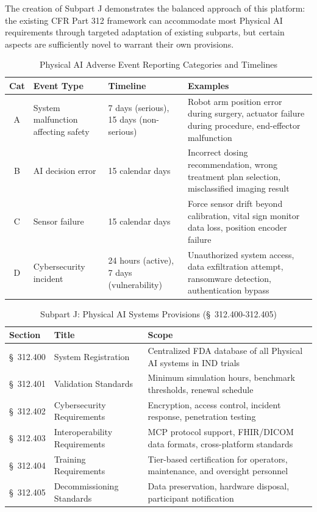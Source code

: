 The creation of Subpart J demonstrates the balanced approach of this platform:
the existing CFR Part 312 framework can accommodate most Physical AI
requirements through targeted adaptation of existing subparts, but certain
aspects are sufficiently novel to warrant their own provisions. 

\begin{table}[H]
\centering
\caption{Physical AI Adverse Event Reporting Categories and Timelines}
\label{tab:ae-categories}
\small
\begin{tabularx}{\textwidth}{c p{4.9cm} p{4.9cm} p{4.9cm}}
\toprule
\textbf{Cat} & \textbf{Event Type} & \textbf{Timeline} & \textbf{Examples} \\
\midrule
A & System malfunction affecting safety & 7 days (serious), 15 days (non-serious) & Robot arm position error during surgery, actuator failure during procedure, end-effector malfunction \\
B & AI decision error & 15 calendar days & Incorrect dosing recommendation, wrong treatment plan selection, misclassified imaging result \\
C & Sensor failure & 15 calendar days & Force sensor drift beyond calibration, vital sign monitor data loss, position encoder failure \\
D & Cybersecurity incident & 24 hours (active), 7 days (vulnerability) & Unauthorized system access, data exfiltration attempt, ransomware detection, authentication bypass \\
\bottomrule
\end{tabularx}
\end{table}

\begin{table}[H]
\centering
\caption{Subpart J: Physical AI Systems Provisions (\S~312.400-312.405)}
\label{tab:subpart-j}
\small
\begin{tabularx}{\textwidth}{l l X}
\toprule
\textbf{Section} & \textbf{Title} & \textbf{Scope} \\
\midrule
\S~312.400 & System Registration & Centralized FDA database of all Physical AI systems in IND trials \\
\S~312.401 & Validation Standards & Minimum simulation hours, benchmark thresholds, renewal schedule \\
\S~312.402 & Cybersecurity Requirements & Encryption, access control, incident response, penetration testing \\
\S~312.403 & Interoperability Requirements & MCP protocol support, FHIR/DICOM data formats, cross-platform standards \\
\S~312.404 & Training Requirements & Tier-based certification for operators, maintenance, and oversight personnel \\
\S~312.405 & Decommissioning Standards & Data preservation, hardware disposal, participant notification \\
\bottomrule
\end{tabularx}
\end{table}

